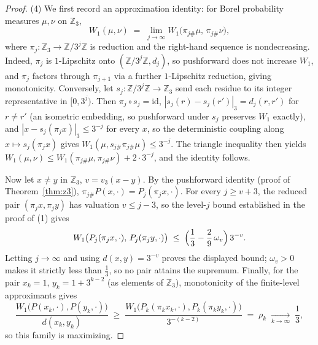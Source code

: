 \documentclass[11pt]{amsart}
\theoremstyle{definition}
\theoremstyle{remark}
\newcommand{\Z}{\mathbb{Z}}
\newcommand{\Zthree}{\Z_3}
\newcommand{\dW}{W_1}
\begin{document}
\begin{proof}
(4) We first record an approximation identity: for Borel probability measures $\mu, \nu$ on $\Zthree$,
\[
\dW(\mu, \nu) \;=\; \lim_{j \to \infty} \dW\bigl(\pi_{j\#}\mu,\, \pi_{j\#}\nu\bigr),
\]
where $\pi_j : \Zthree \to \Z/3^j\Z$ is reduction and the right-hand sequence is nondecreasing. Indeed, $\pi_j$ is $1$-Lipschitz onto $(\Z/3^j\Z, d_j)$, so pushforward does not increase $\dW$, and $\pi_j$ factors through $\pi_{j+1}$ via a further $1$-Lipschitz reduction, giving monotonicity. Conversely, let $s_j : \Z/3^j\Z \to \Zthree$ send each residue to its integer representative in $[0, 3^j)$. Then $\pi_j \circ s_j = \mathrm{id}$, $|s_j(r) - s_j(r')|_3 = d_j(r, r')$ for $r \ne r'$ (an isometric embedding, so pushforward under $s_j$ preserves $\dW$ exactly), and $|x - s_j(\pi_j x)|_3 \le 3^{-j}$ for every $x$, so the deterministic coupling along $x \mapsto s_j(\pi_j x)$ gives $\dW(\mu, s_{j\#}\pi_{j\#}\mu) \le 3^{-j}$. The triangle inequality then yields $\dW(\mu,\nu) \le \dW(\pi_{j\#}\mu, \pi_{j\#}\nu) + 2\cdot 3^{-j}$, and the identity follows.

Now let $x \ne y$ in $\Zthree$, $v = v_3(x - y)$. By the pushforward identity (proof of Theorem~\ref{thm:z3}), $\pi_{j\#} P(x,\cdot) = P_j(\pi_j x, \cdot)$. For every $j \ge v + 3$, the reduced pair $(\pi_j x, \pi_j y)$ has valuation $v \le j - 3$, so the level-$j$ bound established in the proof of (1) gives
\[
\dW\bigl(P_j(\pi_j x,\cdot),\, P_j(\pi_j y,\cdot)\bigr) \;\le\; \Bigl(\frac13 - \frac29\,\omega_v\Bigr)\, 3^{-v} .
\]
Letting $j \to \infty$ and using $d(x,y) = 3^{-v}$ proves the displayed bound; $\omega_v > 0$ makes it strictly less than $\tfrac13$, so no pair attains the supremum. Finally, for the pair $x_k = 1$, $y_k = 1 + 3^{k-2}$ (as elements of $\Zthree$), monotonicity of the finite-level approximants gives
\[
\frac{\dW\bigl(P(x_k,\cdot), P(y_k,\cdot)\bigr)}{d(x_k,y_k)} \;\ge\; \frac{\dW\bigl(P_k(\pi_k x_k,\cdot), P_k(\pi_k y_k,\cdot)\bigr)}{3^{-(k-2)}} \;=\; \rho_k \;\xrightarrow[k\to\infty]{}\; \frac13 ,
\]
so this family is maximizing.
\end{proof}
\end{document}
